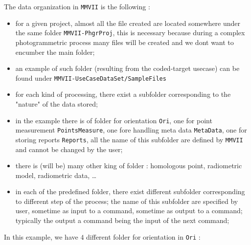The data organization in {\tt MMVII} is the following :

\begin{itemize}
     \item for a given project, almost all the file created are located somewhere under
           the same folder {\tt MMVII-PhgrProj},  this is necessary because during a complex 
           photogrammetric process many files will be created and we dont want to encumber
           the main folder;

     \item an example of such folder (resulting from the coded-target usecase) can be
	     found under {\tt MMVII-UseCaseDataSet/SampleFiles}

     \item for each kind of processing, there exist a subfolder corresponding to the "nature"
            of the data stored;

    \item  in the example there is of folder for orientation {\tt Ori}, one for point measurement
	   {\tt PointsMeasure}, one fore handling meta data {\tt MetaData}, one for storing reports
           {\tt Reports}, all the name of this subfolder are defined by {\tt MMVII} and cannot be changed
            by the user;

    \item there is (will be) many other king of folder : homologous point, radiometric model, radiometric data,
           \dots

     \item in each of the predefined folder, there exist different subfolder corresponding to different step
           of the process; the name of this subfolder are specified by user, sometime as input to a command,
	   sometime as output to a command; typically the output a command being the input of the next command;
\end{itemize}

In this example, we have $4$ different folder for orientation in {\tt Ori} :

